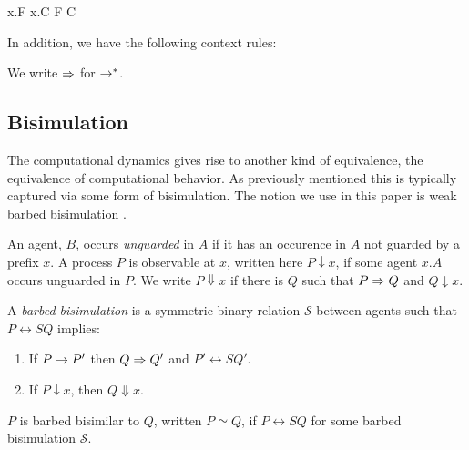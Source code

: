 \documentclass[]{llncs}
\begin{document}
{ x.F \juxtap x.C \red F \circ C }

In addition, we have the following context rules:




We write $\Rightarrow$ for $\rightarrow^*$.

\subsection{Bisimulation}

The computational dynamics gives rise to another kind of equivalence,
the equivalence of computational behavior. As previously mentioned
this is typically captured via some form of bisimulation. The notion
we use in this paper is weak barbed bisimulation \cite{milner91polyadicpi}.




\begin{definition}
  An agent, $B$, occurs \emph{unguarded} in $A$ if it has an occurence
  in $A$ not guarded by a prefix $x$. A process $P$ is observable at
  $x$, written here $P \downarrow x$, if some agent $x.A$ occurs
  unguarded in $P$. We write $P \Downarrow x$ if there is $Q$ such
  that $P \Rightarrow Q$ and $Q \downarrow x$.
\end{definition}

\begin{definition}
A \emph{barbed bisimulation} is a symmetric binary relation 
${\mathcal S}$ between agents such that $P\rel{S}Q$ implies:
\begin{enumerate}
\item If $P \rightarrow P'$ then $Q \Rightarrow Q'$ and $P'\rel{S} Q'$.
\item If $P\downarrow x$, then $Q\Downarrow x$.
\end{enumerate}
$P$ is barbed bisimilar to $Q$, written
$P \simeq Q$, if $P \rel{S} Q$ for some barbed bisimulation ${\mathcal S}$.
\end{definition}
\end{document}
